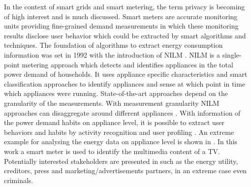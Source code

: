 \documentclass{article}
\begin{document}
In the context of smart grids and smart metering, the term privacy is becoming of high interest and is much discussed. 
Smart meters are accurate monitoring units providing fine-grained demand measurements in which these monitoring results disclose user behavior which could be extracted by smart algorithms and techniques.
The foundation of algorithms to extract energy consumption information was set in 1992 with the introduction of \ac{NILM} \cite{Hart1992}.
\ac{NILM} is a single-point metering approach which detects and identifies appliances in the total power demand of households.
It uses appliance specific characteristics and smart classification approaches to  identify appliances and sense at which point in time which appliances were running.
State-of-the-art approaches \cite{Zeifman2011, Egarter2013BuildSys} depend on the granularity of the measurements.
With  measurement granularity \ac{NILM} approaches can disaggregate around  different appliances \cite{CarrieArmel2013}.
With information of the power demand habits on appliance level, it is possible to extract user behaviors and habits by activity recognition and user profiling \cite{Nguyen2013244,Lisovich2010}.
An extreme example for analysing the energy data on appliance level is shown in \cite{Greveler2012}. 
In this work a smart meter is used to identify the multimedia content of a TV.
Potentially interested stakeholders are presented in \cite{Skopik} such as the energy utility, creditors, press and marketing/advertisements partners, in an extreme case even criminals.
\end{document}
